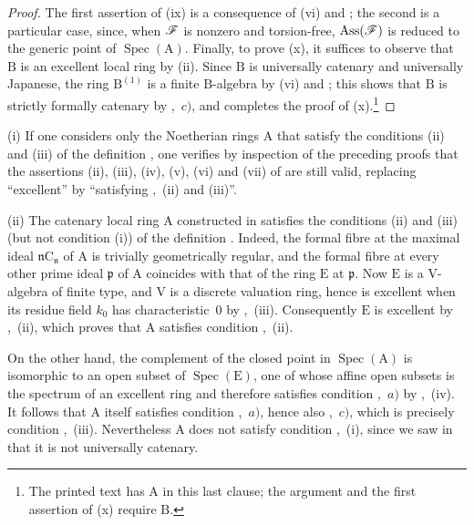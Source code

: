 \begin{proof}
The first assertion of (ix) is a consequence of (vi) and ; the second is a particular case, since, when $\mathscr{F}$ is nonzero and torsion-free, $\operatorname{Ass}(\mathscr{F})$ is reduced to the generic point of $\operatorname{Spec}(\mathrm{A})$. Finally, to prove (x), it suffices to observe that $\mathrm{B}$ is an excellent local ring by (ii). Since $\mathrm{B}$ is universally catenary and universally Japanese, the ring $\mathrm{B}^{(1)}$ is a finite $\mathrm{B}$-algebra by (vi) and ; this shows that $\mathrm{B}$ is strictly formally catenary by ,~$c)$, and completes the proof of (x).\footnote{The printed text has $\mathrm{A}$ in this last clause; the argument and the first assertion of (x) require $\mathrm{B}$.}
\end{proof}

\begin{remarks}[7.8.4]
\label{IV.7.8.4}
(i) If one considers only the Noetherian rings $\mathrm{A}$ that satisfy the conditions (ii) and (iii) of the definition , one verifies by inspection of the preceding proofs that the assertions (ii), (iii), (iv), (v), (vi) and (vii) of  are still valid, replacing ``excellent'' by ``satisfying ,~(ii) and (iii)''.

(ii) The catenary local ring $\mathrm{A}$ constructed in  satisfies the conditions (ii) and (iii) (but not condition (i)) of the definition . Indeed, the formal fibre at the maximal ideal $\mathfrak{n}\mathrm{C}_\mathfrak{n}$ of $\mathrm{A}$ is trivially geometrically regular, and the formal fibre at every other prime ideal $\mathfrak{p}$ of $\mathrm{A}$ coincides with that of the ring $\mathrm{E}$ at $\mathfrak{p}$. Now $\mathrm{E}$ is a $\mathrm{V}$-algebra of finite type, and $\mathrm{V}$ is a discrete valuation ring, hence is excellent when its residue field $k_0$ has characteristic~$0$ by ,~(iii). Consequently $\mathrm{E}$ is excellent by ,~(ii), which proves that $\mathrm{A}$ satisfies condition ,~(ii).


On the other hand, the complement of the closed point in $\operatorname{Spec}(\mathrm{A})$ is isomorphic to an open subset of $\operatorname{Spec}(\mathrm{E})$, one of whose affine open subsets is the spectrum of an excellent ring and therefore satisfies condition ,~$a)$ by ,~(iv). It follows that $\mathrm{A}$ itself satisfies condition ,~$a)$, hence also ,~$c)$, which is precisely condition ,~(iii). Nevertheless $\mathrm{A}$ does not satisfy condition ,~(i), since we saw in  that it is not universally catenary.


\end{remarks}
